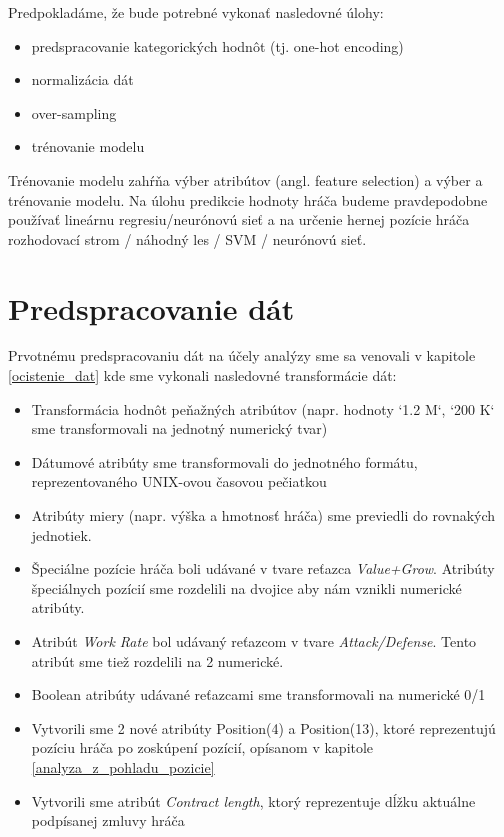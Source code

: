 \documentclass[runningheads]{llncs}
\begin{document}
Predpokladáme, že bude potrebné vykonať nasledovné úlohy:
\begin{itemize}
    \item predspracovanie kategorických hodnôt (tj. one-hot encoding)
    \item normalizácia dát
    \item over-sampling
    \item trénovanie modelu
\end{itemize}

Trénovanie modelu zahŕňa výber atribútov (angl. feature selection) a výber a trénovanie modelu. Na úlohu predikcie hodnoty hráča budeme pravdepodobne používať lineárnu regresiu/neurónovú sieť a na určenie hernej pozície hráča rozhodovací strom / náhodný les / SVM / neurónovú sieť.

\section{Predspracovanie dát}

Prvotnému predspracovaniu dát na účely analýzy sme sa venovali v kapitole \ref{ocistenie_dat} kde sme vykonali nasledovné transformácie dát:
\begin{itemize}
    \item Transformácia hodnôt peňažných atribútov (napr. hodnoty `1.2 M`, `200 K` sme transformovali na jednotný numerický tvar)
    \item Dátumové atribúty sme transformovali do jednotného formátu, reprezentovaného UNIX-ovou časovou pečiatkou
    \item Atribúty miery (napr. výška a hmotnosť hráča) sme previedli do rovnakých jednotiek.
    \item Špeciálne pozície hráča boli udávané v tvare reťazca \textit{Value+Grow}. Atribúty špeciálnych pozícií sme rozdelili na dvojice aby nám vznikli numerické atribúty.
    \item Atribút \textit{Work Rate} bol udávaný reťazcom v tvare \textit{Attack/Defense}. Tento atribút sme tiež rozdelili na 2 numerické.
    \item Boolean atribúty udávané reťazcami sme transformovali na numerické 0/1
    \item Vytvorili sme 2 nové atribúty Position(4) a Position(13), ktoré reprezentujú pozíciu hráča po zoskúpení pozícií, opísanom v kapitole \ref{analyza_z_pohladu_pozicie}
    \item Vytvorili sme atribút \textit{Contract length}, ktorý reprezentuje dĺžku aktuálne podpísanej zmluvy hráča 
\end{itemize}
\end{document}
